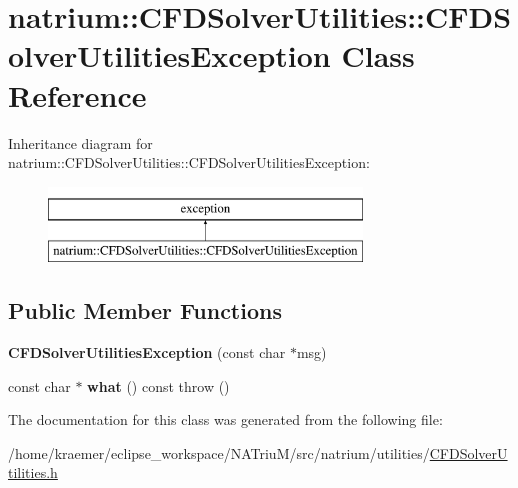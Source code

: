 \hypertarget{classnatrium_1_1CFDSolverUtilities_1_1CFDSolverUtilitiesException}{\section{natrium\-:\-:C\-F\-D\-Solver\-Utilities\-:\-:C\-F\-D\-Solver\-Utilities\-Exception Class Reference}
\label{classnatrium_1_1CFDSolverUtilities_1_1CFDSolverUtilitiesException}
}
Inheritance diagram for natrium\-:\-:C\-F\-D\-Solver\-Utilities\-:\-:C\-F\-D\-Solver\-Utilities\-Exception\-:\begin{figure}[H]
\begin{center}
\leavevmode
\includegraphics[height=2.000000cm]{classnatrium_1_1CFDSolverUtilities_1_1CFDSolverUtilitiesException}
\end{center}
\end{figure}
\subsection*{Public Member Functions}
\begin{DoxyCompactItemize}
\item 
\hypertarget{classnatrium_1_1CFDSolverUtilities_1_1CFDSolverUtilitiesException_a19add4b16c155613f9d8a2fc72bbeca9}{{\bfseries C\-F\-D\-Solver\-Utilities\-Exception} (const char $\ast$msg)}\label{classnatrium_1_1CFDSolverUtilities_1_1CFDSolverUtilitiesException_a19add4b16c155613f9d8a2fc72bbeca9}

\item 
\hypertarget{classnatrium_1_1CFDSolverUtilities_1_1CFDSolverUtilitiesException_a548a8cb9bd2c52753a7c334836ae9865}{const char $\ast$ {\bfseries what} () const   throw ()}\label{classnatrium_1_1CFDSolverUtilities_1_1CFDSolverUtilitiesException_a548a8cb9bd2c52753a7c334836ae9865}

\end{DoxyCompactItemize}


The documentation for this class was generated from the following file\-:\begin{DoxyCompactItemize}
\item 
/home/kraemer/eclipse\-\_\-workspace/\-N\-A\-Triu\-M/src/natrium/utilities/\hyperlink{CFDSolverUtilities_8h}{C\-F\-D\-Solver\-Utilities.\-h}\end{DoxyCompactItemize}
